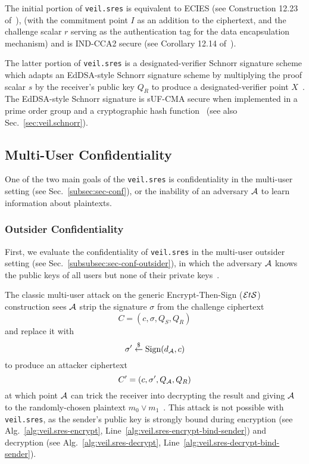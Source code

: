 The initial portion of \texttt{veil.sres} is equivalent to ECIES (see Construction 12.23 of~\cite[p.
    435]{katz2020}), \@(with the commitment point $I$ as an addition to the ciphertext, and the
challenge scalar $r$ serving as the authentication tag for the data encapsulation mechanism) and is
IND-CCA2 secure (see Corollary 12.14 of~\cite[p. 436]{katz2020}).

The latter portion of \texttt{veil.sres} is a designated-verifier Schnorr signature scheme which
adapts an EdDSA-style Schnorr signature scheme by multiplying the proof scalar $s$ by the receiver's
public key $Q_R$ to produce a designated-verifier point $X$~\cite{steinfeld2004}.
The EdDSA-style Schnorr signature is sUF-CMA secure when implemented in a prime order group and a
cryptographic hash function~\cite{brendel2021, chalkias2020, pointcheval2000, neven2009} (see also
Sec.~\ref{sec:veil.schnorr})\@.

\subsection{Multi-User Confidentiality}\label{subsec:veil.sres-conf}

One of the two main goals of the \texttt{veil.sres} is confidentiality in the multi-user setting
(see Sec.~\ref{subsec:sec-conf}), or the inability of an adversary $\mathcal{A}$ to learn information
about plaintexts.

\subsubsection{Outsider Confidentiality}

First, we evaluate the confidentiality of \texttt{veil.sres} in the multi-user outsider setting (see
Sec.~\ref{subsubsec:sec-conf-outsider}), in which the adversary $\mathcal{A}$ knows the public keys
of all users but none of their private keys~\cite[p. 44]{baek2010}\@.

The classic multi-user attack on the generic Encrypt-Then-Sign ($\mathcal{E}t\mathcal{S}$) construction sees
$\mathcal{A}$ strip the signature $\sigma$ from the challenge ciphertext
\[
    C=(c,\sigma,Q_S,Q_R)
\]
and replace it with
\[
    \sigma' \stackrel{\$}{\gets} \text{Sign}(d_{\mathcal{A}},c)
\]
to produce an attacker ciphertext
\[
    C'=(c,\sigma',Q_{\mathcal{A}},Q_R)
\]
at which point $\mathcal{A}$ can trick the receiver into decrypting the result and giving
$\mathcal{A}$ to the randomly-chosen plaintext $m_0 \lor m_1$~\cite[p. 40]{an2010}.
This attack is not possible with \texttt{veil.sres}\@, as the sender's public key is strongly bound
during encryption (see Alg.~\ref{alg:veil.sres-encrypt},
Line~\ref{alg:veil.sres-encrypt-bind-sender}) and decryption (see Alg.~\ref{alg:veil.sres-decrypt},
Line~\ref{alg:veil.sres-decrypt-bind-sender}).

